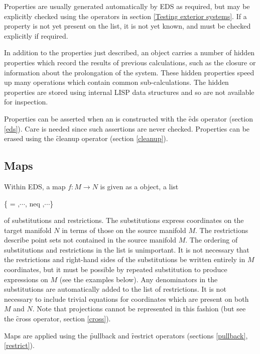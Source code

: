 Properties are usually generated automatically by EDS as required, but may
be explicitly checked using the operators in section \ref{Testing exterior
systems}. If a property is not yet present on the list, it is not yet
known, and must be checked explicitly if required.

In addition to the properties just described, an  object carries
a number of hidden properties which record the results of previous
calculations, such as the closure or information about the prolongation of
the system. These hidden properties speed up many operations which
contain common sub-calculations. The hidden properties are stored using
internal LISP data structures and so are not available for inspection.

Properties can be asserted when an  is constructed with the
\f{eds} operator (section \ref{eds}). Care is needed since such assertions
are never checked. Properties can be erased using the \f{cleanup} operator
(section \ref{cleanup}).

\subsection{Maps}
\label{Maps}

Within EDS, a map $f:M\to N$ is given as a  object, a list 
\begin{syntax}
\{ = ,$\cdots$, neq ,$\cdots$\}
\end{syntax}
of substitutions and restrictions. The substitutions express coordinates on
the target manifold $N$ in terms of those on the source manifold $M$. The
restrictions describe point sets not contained in the source manifold
$M$. The ordering of substitutions and restrictions in the list is
unimportant. It is not necessary that the restrictions and right-hand sides
of the substitutions be written entirely in $M$ coordinates, but it must be
possible by repeated substitution to produce expressions on $M$ (see the
examples below). Any denominators in the substitutions are automatically
added to the list of restrictions. It is not necessary to include trivial
equations for coordinates which are present on both $M$ and $N$. Note that
projections cannot be represented in this fashion (but see the \f{cross}
operator, section \ref{cross}).

Maps are applied using the \f{pullback} and \f{restrict} operators
(sections \ref{pullback}, \ref{restrict}).

